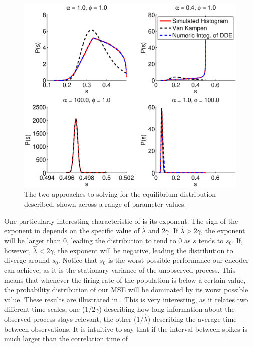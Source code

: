 \begin{figure}
\label{fig:comparison_histograms}
\includegraphics[width=\columnwidth]{figures/figure_3_1.eps}
\caption[Comparison of different solution approaches for the stationary distribution of variances.]{The two approaches to solving for the equilibrium distribution described, shown across a range of parameter values.}
\end{figure}
One particularly interesting characteristic of  is its exponent. The sign of the exponent in  depends on the specific value of $\hat{\lambda}$ 
and $2\gamma$. If $\hat{\lambda} > 2\gamma$, the exponent will be larger than 0, leading the distribution to tend to $0$ as $s$ tends to $s_0$. If, however, 
$\hat{\lambda} < 2\gamma$, the exponent will be negative, leading the distribution to diverge around $s_0$. Notice that $s_0$ is the worst possible performance our encoder can 
achieve, as it is the stationary variance of the unobserved process. This means that whenever the firing rate of the population is below a certain value, the probability distribution of our MSE will 
be dominated by its worst possible value. These results are illustrated in . This is very interesting, as it relates two different time scales, 
one ($1/2\gamma$) describing how long information about the observed process stays relevant, the other ($1/\hat{\lambda}$) describing the average time between observations. It is 
intuitive to say that if the interval between spikes is much larger than the correlation time of
